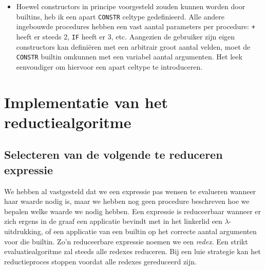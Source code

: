 \documentclass[a4paper,10pt]{article}
\begin{document}
\begin{itemize}
  \paragraph{}
  Behalve operatoren zijn er ook enkele constanten die als builtins worden ge{\"i}mplementeerd.
  Deze kunnen gezien worden als operatoren met 0 argumenten.
  Een voorbeeld hiervan is de \texttt{FAIL} constante, die gebruikt wordt om een gefaalde poging tot pattern matching te indiceren.
\item
  Hoewel constructors in principe voorgesteld zouden kunnen worden door builtins, heb ik een apart \texttt{CONSTR} celtype gedefinieerd.
  Alle andere ingebouwde procedures hebben een vast aantal parameters per procedure: \texttt{+} heeft er steeds 2, \texttt{IF} heeft er 3, etc.
  Aangezien de gebruiker zijn eigen constructors kan defini{\"e}ren met een arbitrair groot aantal velden, moet de \texttt{CONSTR} builtin omkunnen met een variabel aantal argumenten.
  Het leek eenvoudiger om hiervoor een apart celtype te introduceren.
\end{itemize}

\section{Implementatie van het reductiealgoritme}
\subsection{Selecteren van de volgende te reduceren expressie}
We hebben al vastgesteld dat we een expressie pas wensen te evalueren wanneer haar waarde nodig is, maar we hebben nog geen procedure beschreven hoe we bepalen welke waarde we nodig hebben.
Een expressie is reduceerbaar wanneer er zich ergens in de graaf een applicatie bevindt met in het linkerlid een $\lambda$-uitdrukking, of een applicatie van een builtin op het correcte aantal argumenten voor die builtin.
Zo'n reduceerbare expressie noemen we een \emph{redex}.
Een strikt evaluatiealgoritme zal steeds alle redexes reduceren.
Bij een luie strategie kan het reductieproces stoppen voordat alle redexes gereduceerd zijn.
\paragraph{}
\end{document}
